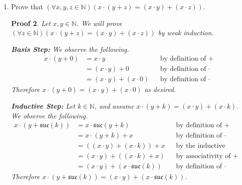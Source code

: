 \documentclass[12pt]{article}
\newcommand{\suc}{\mathfrak{suc}}
\newcommand{\N}{\mathbb{N}}
\theoremstyle{proofstyle}
\newtheorem*{proof*}{Proof}
\begin{document}
\begin{enumerate}[left=0pt, itemsep=2em, parsep=1em]
\begin{proof*}
\medskip
\textit{Case 2:} Suppose $x = k$. Then observe:
\begin{align*}
  x + 1 &= \suc(x) &&\text{by Lemma 6.5}\\
        &= \suc(k) &&\text{since }x = k
\end{align*}
So $1 \in \N$ witnesses $(\exists n \in \N)(x + n = \suc(k))$.

\medskip
In either case, $(\exists n \in \N)(x + n = \suc(k))$ holds. We therefore conclude $x < \suc(k) \Rightarrow (\exists n \in \N)(x + n = \suc(k))$.

Since $x$ was arbitrary, $(\forall x, y \in \N)(x < y \Rightarrow (\exists n \in \N)(x + n = y))$ as desired.
\end{proof*}

\newpage

\item Prove that $(\forall x, y, z \in \N)(x \cdot (y + z) = (x \cdot y) + (x \cdot z))$.

\begin{proof*}
Let $x, y \in \N$. We will prove $(\forall z \in \N)(x \cdot (y + z) = (x \cdot y) + (x \cdot z))$ by weak induction.

\medskip
\textbf{Basis Step:}
We observe the following.
\begin{align*}
  x \cdot (y + 0) &= x \cdot y &&\text{by definition of }+ \\
                  &= (x \cdot y) + 0 &&\text{by definition of }\cdot \\
                  &= (x \cdot y) + (x \cdot 0) &&\text{by definition of }\cdot
\end{align*}
Therefore $x \cdot (y + 0) = (x \cdot y) + (x \cdot 0)$ as desired.

\medskip
\textbf{Inductive Step:}
Let $k \in \N$, and assume $x \cdot (y + k) = (x \cdot y) + (x \cdot k)$. We observe the following.
\begin{align*}
  x \cdot (y + \suc(k))
    &= x \cdot \suc(y + k) &&\text{by definition of }+ \\
    &= x \cdot (y + k) + x &&\text{by definition of }\cdot \\
    &= ((x \cdot y) + (x \cdot k)) + x &&\text{by the inductive hypothesis} \\
    &= (x \cdot y) + ((x \cdot k) + x) &&\text{by associativity of }+ \\
    &= (x \cdot y) + (x \cdot \suc(k)) &&\text{by definition of }\cdot
\end{align*}
Therefore $x \cdot (y + \suc(k)) = (x \cdot y) + (x \cdot \suc(k))$.


\end{proof*}
\end{enumerate}
\end{document}
